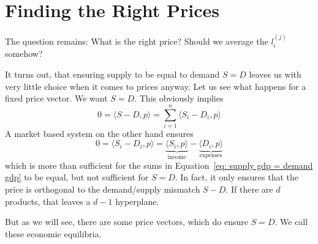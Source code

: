 \section{Finding the Right Prices}


The question remains: What is the right price? Should we average the
\(l^{(j)}_i\) somehow?

It turns out, that ensuring supply to be equal to demand
\(S=D\) leaves us with very little choice when it comes to prices anyway.
Let us see what happens for a fixed price vector. We want \(S=D\). This
obviously implies
\begin{equation}
	\label{eq: supply gdp = demand gdp}
	0 =\langle S-D,p\rangle =  \sum_{i=1}^n \langle S_i - D_i, p\rangle
\end{equation}
A market based system on the other hand ensures
\[
	0 = \langle S_i - D_i, p\rangle
	= \underbrace{\langle S_i, p\rangle}_{\text{income}}
	- \underbrace{\langle D_i,p\rangle}_{\text{expenses}}
\]
which is more than sufficient for the sums in Equation~\eqref{eq: supply gdp =
demand gdp} to be equal, but not sufficient for \(S=D\). In fact, it only
ensures that the price is orthogonal to the demand/supply mismatch \(S-D\).
If there are \(d\) products, that leaves a \(d-1\) hyperplane.

But as we will see, there are some price vectors, which do ensure \(S=D\).
We call these economic equilibria.

